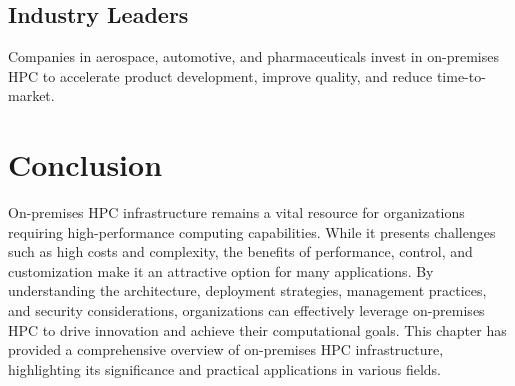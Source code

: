 \subsection{Industry Leaders}

Companies in aerospace, automotive, and pharmaceuticals invest in on-premises HPC to accelerate product development, improve quality, and reduce time-to-market.

\section{Conclusion}

On-premises HPC infrastructure remains a vital resource for organizations requiring high-performance computing capabilities. While it presents challenges such as high costs and complexity, the benefits of performance, control, and customization make it an attractive option for many applications. By understanding the architecture, deployment strategies, management practices, and security considerations, organizations can effectively leverage on-premises HPC to drive innovation and achieve their computational goals. This chapter has provided a comprehensive overview of on-premises HPC infrastructure, highlighting its significance and practical applications in various fields.